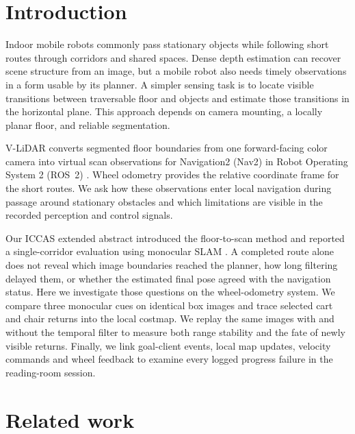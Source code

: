 \documentclass[pdflatex,sn-mathphys-num]{sn-jnl}
\newif\ifdraftreview
\newcommand{\reviewbadge}[1]{%
  \colorbox{reviewfill}{\textcolor{reviewink}{\sffamily\bfseries\strut #1}}}
\newcommand{\pending}[2]{%
  \ifdraftreview
    \hyperlink{author-checklist}{\reviewbadge{#1}}\nobreak\space
    \textcolor{reviewink}{\textbf{[Pending: #2]}}%
  \fi}
\newcommand{\vlidar}{V-LiDAR}
\begin{document}
\section{Introduction}\label{sec:intro}

Indoor mobile robots commonly pass stationary objects while following short routes through corridors and shared spaces. Dense depth estimation can recover scene structure from an image, but a mobile robot also needs timely observations in a form usable by its planner. A simpler sensing task is to locate visible transitions between traversable floor and objects and estimate those transitions in the horizontal plane. This approach depends on camera mounting, a locally planar floor, and reliable segmentation.

\vlidar{} converts segmented floor boundaries from one forward-facing color camera into virtual scan observations for Navigation2 (Nav2) in Robot Operating System 2 (ROS~2) \cite{macenski_2022_robot,macenski_2020_the}. Wheel odometry provides the relative coordinate frame for the short routes. We ask how these observations enter local navigation during passage around stationary obstacles and which limitations are visible in the recorded perception and control signals.

Our ICCAS extended abstract introduced the floor-to-scan method and reported a single-corridor evaluation using monocular SLAM \cite{lee2026iccas}. A completed route alone does not reveal which image boundaries reached the planner, how long filtering delayed them, or whether the estimated final pose agreed with the navigation status. Here we investigate those questions on the wheel-odometry system. We compare three monocular cues on identical box images and trace selected cart and chair returns into the local costmap. We replay the same images with and without the temporal filter to measure both range stability and the fate of newly visible returns. Finally, we link goal-client events, local map updates, velocity commands and wheel feedback to examine every logged progress failure in the reading-room session.

\pending{R7}{Confirm the specific ICCAS proceedings entry and the IJCAS disposition before finalizing the cover letter.}

\section{Related work}\label{sec:related}
\end{document}
